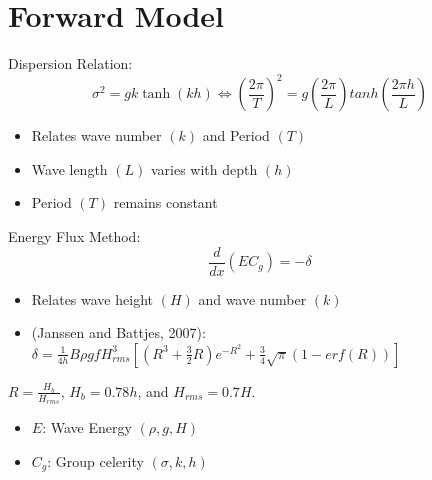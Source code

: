 \documentclass{amsart}
\numberwithin{equation}{section}
\begin{document}
 \section{Forward Model}
Dispersion Relation:
$$ \sigma^2=gk\tanh(kh) \Longleftrightarrow \left(\frac{2\pi}{T}\right)^2 = g\left(\frac{2\pi}{L}\right) tanh \left(\frac{2\pi h}{L}\right)
$$
\begin{itemize}
\item Relates wave number $(k)$ and Period $(T)$
\item Wave length $(L)$ varies with depth $(h)$
\item Period $(T)$ remains constant
\end{itemize}

Energy Flux Method:
$$\frac{d}{dx}\left(EC_g\right)=-\delta $$
\begin{itemize}
\item Relates wave height $(H)$ and wave number $(k)$
\item (Janssen and Battjes, 2007): $\delta = \frac{1}{4h}B\rho g f H^3_{rms}\left[(R^3+\frac{3}{2}R)e^{-R^2}+\frac{3}{4}\sqrt{\pi}(1-erf(R))\right]$
\end{itemize}
$R=\frac{H_b}{H_{rms}}$, $H_b=0.78h$, and $H_{rms}=0.7H$.
\begin{itemize}
\item $E$: Wave Energy $(\rho,g,H)$
\item $C_{g}$: Group celerity $(\sigma,k,h)$
\end{itemize}
\end{document}
